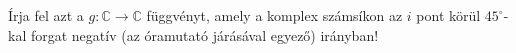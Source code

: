 \documentclass[11pt]{scrartcl}
\begin{document}
Írja fel azt a $g : \mathbb{C} \to \mathbb{C}$ függvényt, amely a komplex
számsíkon az $i$ pont körül $45^\circ$-kal forgat negatív (az óramutató
járásával egyező) irányban!
\end{document}
